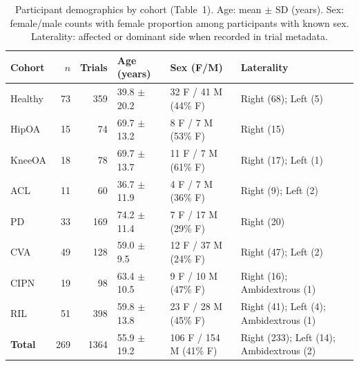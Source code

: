 
\begin{table}[!t]
\renewcommand{\arraystretch}{1.15}
\caption{Participant demographics by cohort (Table~1). Age: mean $\pm$ SD (years). Sex: female/male counts with female proportion among participants with known sex. Laterality: affected or dominant side when recorded in trial metadata.}
\label{tab:demographics}
\centering
\small
\begin{tabular}{lrrlll}
\hline\hline
\textbf{Cohort} & \textbf{$n$} & \textbf{Trials} & \textbf{Age (years)} & \textbf{Sex (F/M)} & \textbf{Laterality} \\
\hline
Healthy & 73 & 359 & 39.8 $\pm$ 20.2 & 32 F / 41 M (44\% F) & Right (68); Left (5) \\
HipOA & 15 & 74 & 69.7 $\pm$ 13.2 & 8 F / 7 M (53\% F) & Right (15) \\
KneeOA & 18 & 78 & 69.7 $\pm$ 13.7 & 11 F / 7 M (61\% F) & Right (17); Left (1) \\
ACL & 11 & 60 & 36.7 $\pm$ 11.9 & 4 F / 7 M (36\% F) & Right (9); Left (2) \\
PD & 33 & 169 & 74.2 $\pm$ 11.4 & 7 F / 17 M (29\% F) & Right (20) \\
CVA & 49 & 128 & 59.0 $\pm$ 9.5 & 12 F / 37 M (24\% F) & Right (47); Left (2) \\
CIPN & 19 & 98 & 63.4 $\pm$ 10.5 & 9 F / 10 M (47\% F) & Right (16); Ambidextrous (1) \\
RIL & 51 & 398 & 59.8 $\pm$ 13.8 & 23 F / 28 M (45\% F) & Right (41); Left (4); Ambidextrous (1) \\
\textbf{Total} & 269 & 1364 & 55.9 $\pm$ 19.2 & 106 F / 154 M (41\% F) & Right (233); Left (14); Ambidextrous (2) \\
\hline\hline
\end{tabular}
\end{table}
